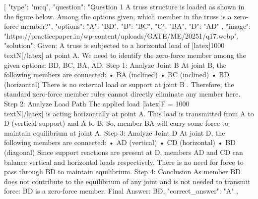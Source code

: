 [
  {
    "type": "mcq",
    "question": "Question 1 A truss structure is loaded as shown in the figure below. Among the options given, which member in the truss is a zero-force member?",
    "options": {
      "A": "BD",
      "B": "BC",
      "C": "BA",
      "D": "AD"
    },
    "image": "https://practicepaper.in/wp-content/uploads/GATE/ME/20251/q17.webp",
    "solution": Given: A truss is subjected to a horizontal load of [latex]1000 \\text{N}[/latex] at point A. We need to identify the zero-force member among the given options: BD, BC, BA, AD. Step 1: Analyze Joint B At joint B, the following members are connected: • BA (inclined) • BC (inclined) • BD (horizontal) There is no external load or support at joint B . Therefore, the standard zero-force member rules cannot directly eliminate any member here. Step 2: Analyze Load Path The applied load [latex]F = 1000 \\text{N}[/latex] is acting horizontally at point A. This load is transmitted from A to D (vertical support) and A to B. So, member BA will carry some force to maintain equilibrium at joint A. Step 3: Analyze Joint D At joint D, the following members are connected: • AD (vertical) • CD (horizontal) • BD (diagonal) Since support reactions are present at D, members AD and CD can balance vertical and horizontal loads respectively. There is no need for force to pass through BD to maintain equilibrium. Step 4: Conclusion As member BD does not contribute to the equilibrium of any joint and is not needed to transmit force: BD is a zero-force member. Final Answer: BD,
    "correct_answer": "A"
  },
